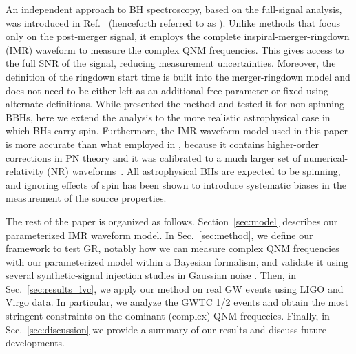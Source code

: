 An independent approach to BH spectroscopy, based on the full-signal
analysis, was introduced in Ref.~\cite{Brito:2018rfr}
(henceforth referred to as \paperone). Unlike methods that focus only
on the post-merger signal, it employs the
complete inspiral-merger-ringdown
(IMR) waveform to measure the complex QNM
frequencies. This gives access to the full SNR of the signal,
reducing measurement uncertainties. Moreover, the definition of the
ringdown start time is built into the merger-ringdown model and does not need to be
either left as an additional free parameter or fixed using alternate
definitions. While \paperone presented the method and tested it for non-spinning BBHs, here we extend the analysis to the more
realistic astrophysical case in which BHs carry spin. Furthermore,
the IMR waveform model used in this paper is more accurate than what employed in \paperone,
because it contains higher-order corrections in PN theory and it was calibrated to a much larger set
of numerical-relativity (NR) waveforms~\cite{Bohe:2016gbl}. All astrophysical BHs are expected to be spinning,
and ignoring effects of spin has been shown to introduce systematic biases in the measurement of the
source properties.

The rest of the paper is organized as follows. Section~\ref{sec:model} describes our parameterized IMR
waveform model. In Sec.~\ref{sec:method}, we define our framework to test GR, notably how we can measure
complex QNM frequencies with our parameterized model within a Bayesian formalism, and validate it using 
several synthetic-signal injection studies in Gaussian noise . Then, in Sec.~\ref{sec:results_lvc},
we apply our method on real GW events using LIGO and Virgo data. In particular, we analyze
the GWTC 1/2  events and obtain the most stringent constraints on the dominant (complex) QNM frequecies. Finally, in Sec.~\ref{sec:discussion} we provide a summary of
our results and discuss future developments.

